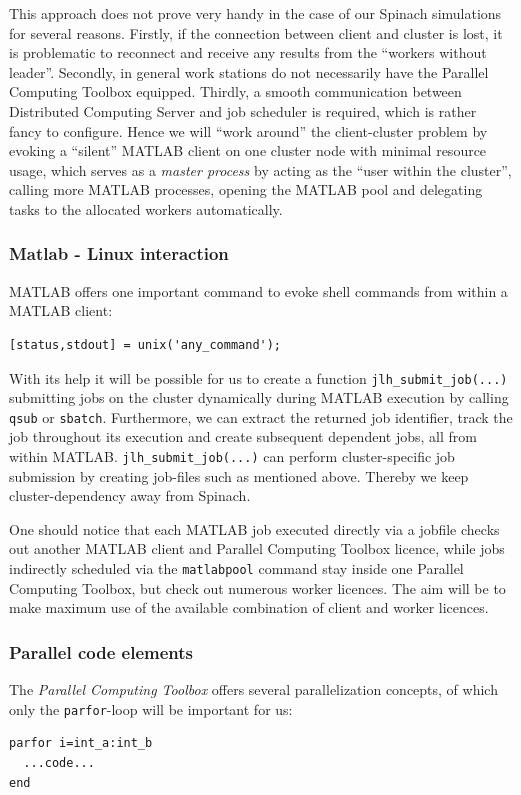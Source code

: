 \documentclass[11.5pt,a4paper]{article}
\begin{document}
This approach does not prove very handy in the case of our Spinach simulations for several reasons. Firstly, if the connection between client and cluster is lost, it is problematic to reconnect and receive any results from the ``workers without leader''. Secondly, in general work stations do not necessarily have the Parallel Computing Toolbox equipped. Thirdly, a smooth communication between Distributed Computing Server and job scheduler is required, which is rather fancy to configure. Hence we will ``work around'' the client-cluster problem by evoking a ``silent'' MATLAB client on one cluster node with minimal resource usage, which serves as a \emph{master process} by acting as the ``user within the cluster'', calling more MATLAB processes, opening the MATLAB pool and delegating tasks to the allocated workers automatically.

\subsubsection{Matlab - Linux interaction}
MATLAB offers one important command to evoke shell commands from within a MATLAB client:
\begin{lstlisting}
[status,stdout] = unix('any_command');
\end{lstlisting}
With its help it will be possible for us to create a function \verb$jlh_submit_job(...)$ submitting jobs on the cluster dynamically during MATLAB execution by calling \verb$qsub$ or \verb$sbatch$. Furthermore, we can extract the returned job identifier, track the job throughout its execution and create subsequent dependent jobs, all from within MATLAB. \verb$jlh_submit_job(...)$ can perform cluster-specific job submission by creating job-files such as mentioned above. Thereby we keep cluster-dependency away from Spinach. %

One should notice that each MATLAB job executed directly via a jobfile checks out another MATLAB client and Parallel Computing Toolbox licence, while jobs indirectly scheduled via the \verb$matlabpool$ command stay inside one Parallel Computing Toolbox, but check out numerous worker licences. The aim will be to make maximum use of the available combination of client and worker licences.

\subsubsection{Parallel code elements}
The \emph{Parallel Computing Toolbox} offers several parallelization concepts, of which only the \verb$parfor$-loop will be important for us:
\begin{lstlisting}
parfor i=int_a:int_b
  ...code...
end
\end{lstlisting}
\end{document}
